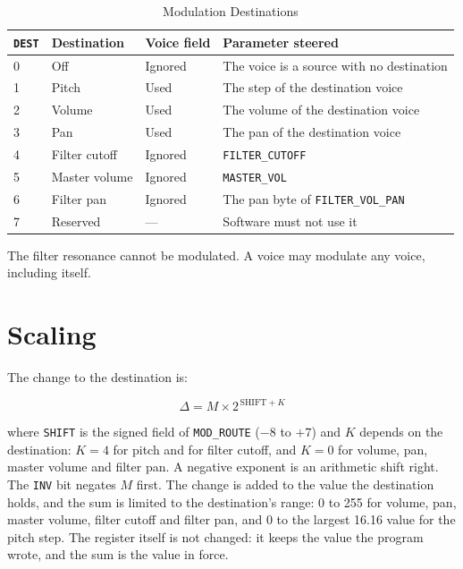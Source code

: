 \begin{table}[H]
	\centering
	\begin{tabular}{lllp{6.4cm}}
		\toprule
		\textbf{\texttt{DEST}} & \textbf{Destination} & \textbf{Voice field} & \textbf{Parameter steered}                \\
		\midrule
		0                      & Off                  & Ignored              & The voice is a source with no destination \\
		1                      & Pitch                & Used                 & The step of the destination voice         \\
		2                      & Volume               & Used                 & The volume of the destination voice       \\
		3                      & Pan                  & Used                 & The pan of the destination voice          \\
		4                      & Filter cutoff        & Ignored              & \texttt{FILTER\_CUTOFF}                   \\
		5                      & Master volume        & Ignored              & \texttt{MASTER\_VOL}                      \\
		6                      & Filter pan           & Ignored              & The pan byte of \texttt{FILTER\_VOL\_PAN} \\
		7                      & Reserved             & ---                  & Software must not use it                  \\
		\bottomrule
	\end{tabular}
	\caption{Modulation Destinations}
	\label{tab:mod-destinations}
\end{table}

The filter resonance cannot be modulated. A voice may modulate any voice, including itself.

\section{Scaling}
\label{sec:mod-scaling}

The change to the destination is:

\begin{equation*}
	\Delta = M \times 2^{\,\mathrm{SHIFT} + K}
\end{equation*}

\noindent where \texttt{SHIFT} is the signed field of \texttt{MOD\_ROUTE} ($-8$ to $+7$) and $K$ depends on the destination:
$K = 4$ for pitch and for filter cutoff, and $K = 0$ for volume, pan, master volume and filter pan. A negative exponent is an
arithmetic shift right. The \texttt{INV} bit negates $M$ first. The change is added to the value the destination
holds, and the sum is limited to the destination's range: 0 to 255 for volume, pan, master volume, filter cutoff and
filter pan, and 0 to the largest 16.16 value for the pitch step. The register itself is not changed: it keeps the value the
program wrote, and the sum is the value in force.


